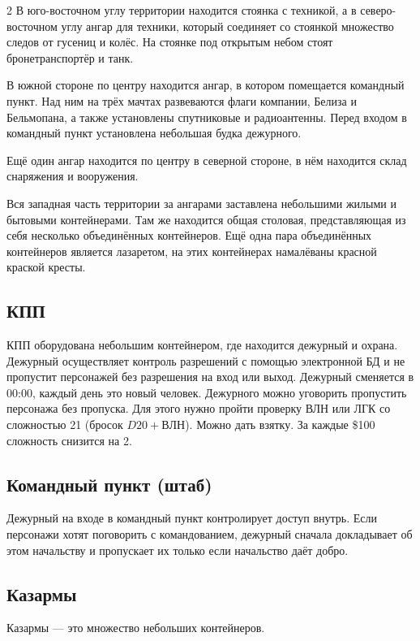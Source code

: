 \documentclass[twoside]{article}
\begin{document}
\begin{multicols}{2}
В юго-восточном углу территории находится стоянка с техникой, а в
северо-восточном углу ангар для техники, который соединяет со стоянкой
множество следов от гусениц и колёс. На стоянке под открытым небом стоят
бронетранспортёр и танк.

В южной стороне по центру находится ангар, в котором помещается
командный пункт. Над ним на трёх мачтах развеваются флаги компании,
Белиза и Бельмопана, а также установлены спутниковые и радиоантенны.
Перед входом в командный пункт установлена небольшая будка дежурного.

Ещё один ангар находится по центру в северной стороне, в нём находится
склад снаряжения и вооружения.

Вся западная часть территории за ангарами заставлена небольшими жилыми и
бытовыми контейнерами. Там же находится общая столовая, представляющая
из себя несколько объединённых контейнеров. Ещё одна пара объединённых
контейнеров является лазаретом, на этих контейнерах намалёваны красной
краской кресты.

\subsection{КПП}\label{checkpoint}

КПП оборудована небольшим контейнером, где находится дежурный и охрана.
Дежурный осуществляет контроль разрешений с помощью электронной БД и не
пропустит персонажей без разрешения на вход или выход. Дежурный
сменяется в 00:00, каждый день это новый человек. Дежурного можно
уговорить пропустить персонажа без пропуска. Для этого нужно пройти
проверку ВЛН или ЛГК со сложностью 21 (бросок $D20 + ВЛН$).
Можно дать взятку. За каждые \$100 сложность снизится на 2.

\subsection{Командный пункт (штаб)}\label{command-post}

Дежурный на входе в командный пункт контролирует доступ внутрь. Если
персонажи хотят поговорить с командованием, дежурный сначала докладывает
об этом начальству и пропускает их только если начальство даёт добро.

\subsection{Казармы}\label{base-barracks}

Казармы --- это множество небольших контейнеров.


\end{multicols}
\end{document}
